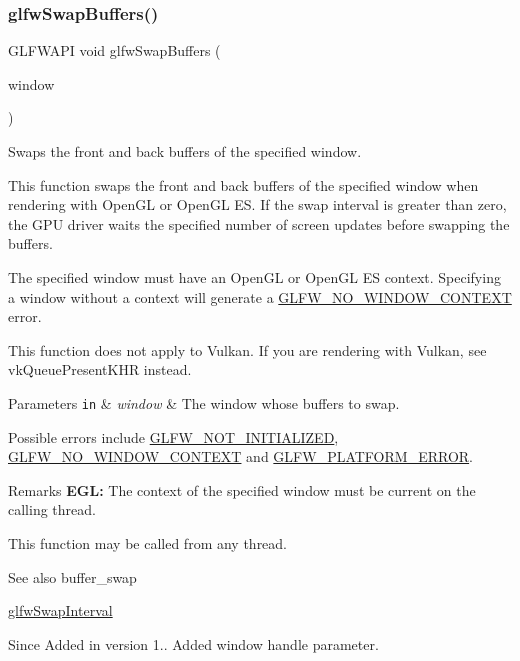 \subsubsection{\texorpdfstring{glfw\+Swap\+Buffers()}{glfwSwapBuffers()}}
{\footnotesize\ttfamily G\+L\+F\+W\+A\+PI void glfw\+Swap\+Buffers (\begin{DoxyParamCaption}\item[{\hyperlink{group__window_ga3c96d80d363e67d13a41b5d1821f3242}{G\+L\+F\+Wwindow} $\ast$}]{window }\end{DoxyParamCaption})}



Swaps the front and back buffers of the specified window. 

This function swaps the front and back buffers of the specified window when rendering with Open\+GL or Open\+GL ES. If the swap interval is greater than zero, the G\+PU driver waits the specified number of screen updates before swapping the buffers.

The specified window must have an Open\+GL or Open\+GL ES context. Specifying a window without a context will generate a \hyperlink{group__errors_gacff24d2757da752ae4c80bf452356487}{G\+L\+F\+W\+\_\+\+N\+O\+\_\+\+W\+I\+N\+D\+O\+W\+\_\+\+C\+O\+N\+T\+E\+XT} error.

This function does not apply to Vulkan. If you are rendering with Vulkan, see {\ttfamily vk\+Queue\+Present\+K\+HR} instead.


\begin{DoxyParams}[1]{Parameters}
\mbox{\tt in}  & {\em window} & The window whose buffers to swap.\\
\hline
\end{DoxyParams}
Possible errors include \hyperlink{group__errors_ga2374ee02c177f12e1fa76ff3ed15e14a}{G\+L\+F\+W\+\_\+\+N\+O\+T\+\_\+\+I\+N\+I\+T\+I\+A\+L\+I\+Z\+ED}, \hyperlink{group__errors_gacff24d2757da752ae4c80bf452356487}{G\+L\+F\+W\+\_\+\+N\+O\+\_\+\+W\+I\+N\+D\+O\+W\+\_\+\+C\+O\+N\+T\+E\+XT} and \hyperlink{group__errors_gad44162d78100ea5e87cdd38426b8c7a1}{G\+L\+F\+W\+\_\+\+P\+L\+A\+T\+F\+O\+R\+M\+\_\+\+E\+R\+R\+OR}.

\begin{DoxyRemark}{Remarks}
{\bfseries E\+GL\+:} The context of the specified window must be current on the calling thread.
\end{DoxyRemark}
This function may be called from any thread.

\begin{DoxySeeAlso}{See also}
buffer\+\_\+swap 

\hyperlink{group__context_ga12a595c06947cec4967c6e1f14210a8a}{glfw\+Swap\+Interval}
\end{DoxySeeAlso}
\begin{DoxySince}{Since}
Added in version 1..  Added window handle parameter. 
\end{DoxySince}
\mbox{\label{group__window_ga6e042d05823c11e11c7339b81a237738}} 
